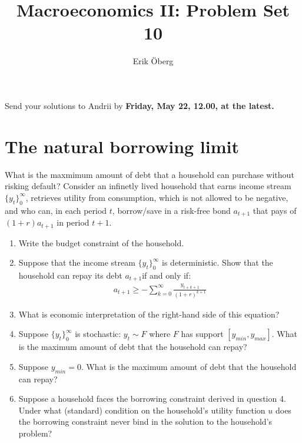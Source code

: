 \documentclass{article}[11pt]
\title{Macroeconomics II: Problem Set 10}
\author{Erik \"{O}berg}
\date{}
\newcommand{\ben}{\begin{enumerate}}
\newcommand{\een}{\end{enumerate}}
\begin{document}
\maketitle

Send your solutions to Andrii by \bf Friday, May 22, 12.00, \normalfont at the latest.


	
\section*{The natural borrowing limit}
What is the maxmimum amount of debt that a household can purchase without risking default? Consider an infinetly lived household that earns income stream $\{y_t\}^{\infty}_{0}$, retrieves utility from consumption, which is not allowed to be negative, and who can, in each period $t$, borrow/save in a risk-free bond $a_{t+1}$ that pays of $(1+r)a_{t+1}$ in period $t+1$.
\ben
	\item Write the budget constraint of the household.

	\item Suppose that the income stream $\{y_t\}^{\infty}_{0}$ is deterministic. Show that the household can repay its debt $a_{t+1} $if and only if:
	\begin{eqnarray}
		a_{t+1} \geq - \sum_{k=0}^{\infty} \frac{y_{t+k+1}}{(1+r)^{k+1}} \nonumber
	\end{eqnarray}
	
	\item What is economic interpretation of the right-hand side of this equation?
	
	\item Suppose $\{y_t\}^{\infty}_{0}$ is stochastic: $y_t \sim F$ where $F$ has support $[y_{min}, y_{max}]$. What is the maximum amount of debt that the household can repay?
	
	\item Suppose $y_{min}=0$. What is the maximum amount of debt that the household can repay?
	
	\item Suppose a household faces the borrowing constraint derived in question 4. Under what (standard) condition on the household's utility function $u$ does the borrowing constraint never bind in the solution to the household's problem?
\een
\end{document}
